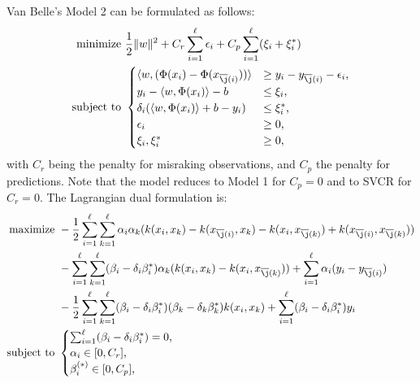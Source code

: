 \documentclass[12pt]{report}
\begin{document}
Van Belle's Model 2 can be formulated as follows:
\begin{equation} \label{model2primal}
\begin{split}
\text{minimize} &\ \dfrac{1}{2}\| w \|^2 + C_{r}\sum_{i=1}^{\ell}\epsilon_{i} + C_{p}\sum_{i=1}^{\ell}(\xi_{i} + \xi_{i}^{*}) \\
\text{subject to} &\ \begin{cases}
\langle w,(\Phi(x_{i}) - \Phi(x_{\overline{\j}(i)})) \rangle &\geq y_{i} - y_{\overline{\j}(i)} - \epsilon_{i} \text{,}\\
y_{i} - \langle w,\Phi(x_{i}) \rangle - b &\leq \xi_{i} \text{,}\\
\delta_{i}(\langle w,\Phi(x_{i}) \rangle + b - y_{i}) &\leq \xi_{i}^{*} \text{,}\\
\epsilon_{i} &\geq 0 \text{,}\\
\xi_{i}, \xi_{i}^{*} &\geq 0 \text{,}
\end{cases}
\end{split}
\end{equation}
with $C_{r}$ being the penalty for misraking observations, and $C_{p}$ the penalty for predictions. Note that the model reduces to Model 1 for $C_{p}=0$ and to SVCR for $C_{r}=0$.
The Lagrangian dual formulation is:
\begin{equation} \label{model2dual}
\begin{split}
\text{maximize} &\
-\dfrac{1}{2}\sum_{i=1}^{\ell}\sum_{k=1}^{\ell}\alpha_{i}\alpha_{k}(k(x_{i},x_{k})-k(x_{\overline{\j}(i)},x_{k})-k(x_{i},x_{\overline{\j}(k)})+k(x_{\overline{\j}(i)},x_{\overline{\j}(k)})) \\
&\ - \sum_{i=1}^{\ell}\sum_{k=1}^{\ell}(\beta_{i} - \delta_{i}\beta_{i}^{*})\alpha_{k}(k(x_{i},x_{k}) - k(x_{i},x_{\overline{\j}(k)})) + \sum_{i=1}^{\ell}\alpha_{i}(y_{i} - y_{\overline{\j}(i)}) \\
&\ - \dfrac{1}{2}\sum_{i=1}^{\ell}\sum_{k=1}^{\ell}(\beta_{i} - \delta_{i}\beta_{i}^{*})(\beta_{k} - \delta_{k}\beta_{k}^{*})k(x_{i},x_{k}) + \sum_{i=1}^{\ell}(\beta_{i} - \delta_{i}\beta_{i}^{*})y_{i}\\
\text{subject to} &\ \begin{cases}
\sum_{i=1}^{\ell}(\beta_{i} - \delta_{i}\beta_{i}^{*}) = 0 \text{,}\\
\alpha_{i} \in [0,C_{r}] \text{,}\\
\beta_{i}^{(*)} \in [0,C_{p}] \text{,}
\end{cases}
\end{split}
\end{equation}
\end{document}
